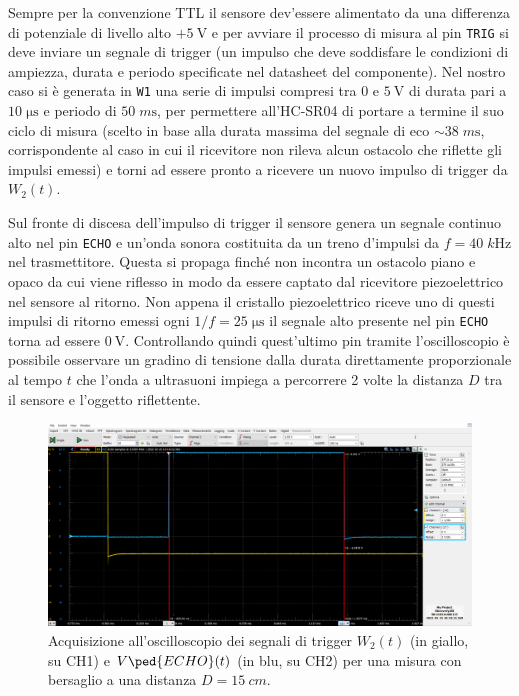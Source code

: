 \documentclass[10pt, a4paper, italian]{article}
\begin{document}
Sempre per la convenzione TTL il sensore dev'essere alimentato da una
differenza di potenziale di livello alto $+\SI{5}{\V}$ e per avviare il
processo di misura al pin \verb+TRIG+ si deve inviare un segnale di trigger
(un impulso che deve soddisfare le condizioni di ampiezza, durata e periodo
specificate nel datasheet del componente). Nel nostro caso si è generata in
\verb+W1+ una serie di impulsi compresi tra 0 e $\SI{5}{\V}$ di durata pari a
$10 \; \si{\micro\s}$ e periodo di $50 \; \si{m\s}$, per permettere all'HC-SR04
di portare a termine il suo ciclo di misura (scelto in base alla durata
massima del segnale di eco $\sim 38 \; \si{m\s}$, corrispondente al caso in
cui il ricevitore non rileva alcun ostacolo che riflette gli impulsi emessi)
e torni ad essere pronto a ricevere un nuovo impulso di trigger da $W_2 (t)$.

Sul fronte di discesa dell'impulso di trigger il sensore genera un segnale
continuo alto nel pin \verb+ECHO+ e un'onda sonora costituita da un treno
d'impulsi da $f = 40 \; \si{k\Hz}$ nel trasmettitore.
Questa si propaga finché non incontra un ostacolo piano e opaco da cui viene
riflesso in modo da essere captato dal ricevitore piezoelettrico nel sensore
al ritorno. Non appena il cristallo piezoelettrico riceve uno di questi
impulsi di ritorno emessi ogni $1/f = 25 \; \si{\micro\s}$ il segnale alto
presente nel pin \verb+ECHO+ torna ad essere $\SI{0}{\V}$. Controllando quindi
quest'ultimo pin tramite l'oscilloscopio è possibile osservare un gradino di
tensione dalla durata direttamente proporzionale al tempo $t$ che l'onda a
ultrasuoni impiega a percorrere 2 volte la distanza $D$ tra il sensore e
l'oggetto riflettente.
\begin{figure}[htbp]
    \centering
	\includegraphics[scale=0.4]{echo}
    \caption{Acquisizione all'oscilloscopio dei segnali di trigger $W_2 (t)$
    (in giallo, su CH1) e $V\ped{ECHO} (t)$ (in blu, su CH2) per una misura
    con bersaglio a una distanza $D = \SI{15}{cm}$.}
\end{figure}
\end{document}
